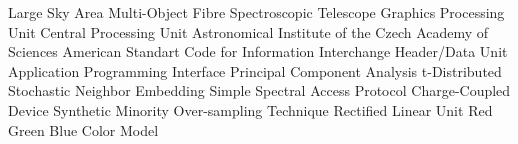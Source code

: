   {Large Sky Area Multi-Object Fibre Spectroscopic Telescope}
     {Graphics Processing Unit}
     {Central Processing Unit}
 {Astronomical Institute of the Czech Academy of Sciences}
   {American Standart Code for Information Interchange}
     {Header/Data Unit}
     {Application Programming Interface}
     {Principal Component Analysis}
   {t-Distributed Stochastic Neighbor Embedding}
    {Simple Spectral Access Protocol}
     {Charge-Coupled Device}
   {Synthetic Minority Over-sampling Technique}
    {Rectified Linear Unit}
     {Red Green Blue Color Model}
